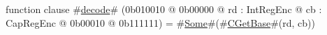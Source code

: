 function clause #\hyperref[zdecode]{decode}# (0b010010 @ 0b00000 @ rd : IntRegEnc @ cb : CapRegEnc @    0b00010 @ 0b111111) = #\hyperref[zSome]{Some}#(#\hyperref[zCGetBase]{CGetBase}#(rd, cb))
